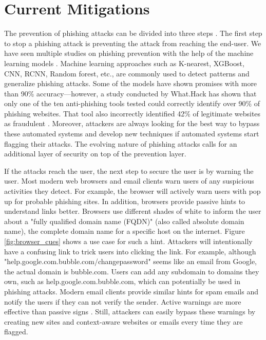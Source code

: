 \section{Current Mitigations}
The prevention of phishing attacks can be divided into three steps \cite{vayansky}. The first step to stop a phishing attack is preventing the attack from reaching the end-user. We have seen multiple studies on phishing prevention with the help of the machine learning models \cite{yang_zheng_wu_wu_wang_2021, sahingoz_buber_demir_diri_2019}. Machine learning approaches such as K-nearest, XGBoost, CNN, RCNN, Random forest, etc., are commonly used to detect patterns and generalize phishing attacks. Some of the models have shown promises with more than 90\% accuracy—however, a study conducted by What.Hack has shown that only one of the ten anti-phishing tools tested could correctly identify over 90\% of phishing websites. That tool also incorrectly identified 42\% of legitimate websites as fraudulent \cite{what_hack}. Moreover, attackers are always looking for the best way to bypass these automated systems and develop new techniques if automated systems start flagging their attacks. The evolving nature of phishing attacks calls for an additional layer of security on top of the prevention layer.

If the attacks reach the user, the next step to secure the user is by warning the user. Most modern web browsers and email clients warn users of any suspicious activities they detect. For example, the browser will actively warn users with pop up for probable phishing sites. In addition, browsers provide passive hints to understand links better. Browsers use different shades of white to inform the user about a "fully qualified domain name (FQDN)" (also called absolute domain name), the complete domain name for a specific host on the internet. Figure \ref*{fig:browser_cues} shows a use case for such a hint. Attackers will intentionally have a confusing link to trick users into clicking the link. For example, although "help.google.com.bubble.com/changepassword" seems like an email from Google, the actual domain is bubble.com. Users can add any subdomain to domains they own, such as help.google.com.bubble.com, which can potentially be used in phishing attacks. Modern email clients provide similar hints for spam emails and notify the users if they can not verify the sender. Active warnings are more effective than passive signs \cite{vayansky}. Still, attackers can easily bypass these warnings by creating new sites and context-aware websites or emails every time they are flagged.

